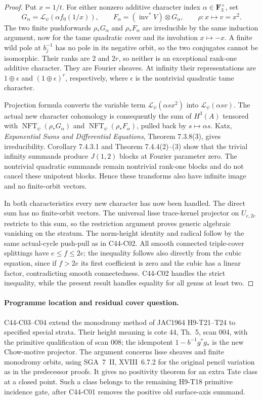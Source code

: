 \begin{proof}
Put $x=1/t$. For either nonzero additive character index
$\alpha\in\mathbf F_3^\times$, set
\[
 G_\alpha=\mathcal L_\psi(\alpha f_0(1/x)),\qquad
 F_\alpha=(\operatorname{inv}^*V)\otimes G_\alpha,
 \qquad \rho:x\longmapsto v=x^2.
\]
The two finite pushforwards $\rho_*G_\alpha$ and
$\rho_*F_\alpha$ are irreducible by the same induction argument,
now for the tame quadratic cover and its involution $x\mapsto-x$.
A finite wild pole at $b_j^{-1}$ has no pole in its negative orbit,
so the two conjugates cannot be isomorphic. Their ranks are $2$
and $2r$, so neither is an exceptional rank-one additive character.
They are Fourier sheaves. At infinity their representations are
$1\oplus\epsilon$ and $(1\oplus\epsilon)^r$, respectively,
where $\epsilon$ is the nontrivial quadratic tame character.

Projection formula converts the variable term
$\mathcal L_\psi(\alpha s x^2)$ into
$\mathcal L_\psi(\alpha s v)$. The actual new character
cohomology is consequently the sum of $H^3(A)$ tensored with
$\operatorname{NFT}_\psi(\rho_*G_\alpha)$ and
$\operatorname{NFT}_\psi(\rho_*F_\alpha)$, pulled back by
$s\mapsto\alpha s$. Katz, \emph{Exponential Sums and Differential
Equations}, Theorem 7.3.8(3), gives irreducibility. Corollary
7.4.3.1 and Theorem 7.4.4(2)--(3) show that the trivial infinity
summands produce $J(1,2)$ blocks at Fourier parameter zero.
The nontrivial quadratic summands remain nontrivial rank-one
blocks and do not cancel these unipotent blocks. Hence these
transforms also have infinite image and no finite-orbit vectors.

In both characteristics every new character has now been handled.
The direct sum has no finite-orbit vectors. The universal lisse
trace-kernel projector on $U_{e,2e}$ restricts to this sum, so
the restriction argument proves generic algebraic vanishing on
the stratum. The norm-height identity and radical follow by
the same actual-cycle push-pull as in C44-C02. All smooth connected
triple-cover splittings have $e\le f\le2e$; the inequality follows
also directly from the cubic equation, since if $f>2e$ its first
coefficient is zero and the cubic has a linear factor, contradicting
smooth connectedness. C44-C02 handles the strict inequality, while
the present result handles equality for all genus at least two.
\end{proof}

\paragraph{Programme location and residual cover question.}
C44-C03--C04 extend the monodromy method of JAC1964 H9-T21--T24 to
specified special strata. Their height meaning is cote 44, Th.~5,
scan 004, with the primitive qualification of scan 008; the
idempotent $1-b^{-1}g^*g_*$ is the new Chow-motive projector.
The argument concerns lisse sheaves and finite monodromy orbits,
using SGA~7~II, XVIII~6.7.2 for the original pencil variation as
in the predecessor proofs. It gives no positivity theorem for an
extra Tate class at a closed point. Such a class belongs to the
remaining H9-T18 primitive incidence gate, after C44-C01 removes
the positive old surface-axis summand.

